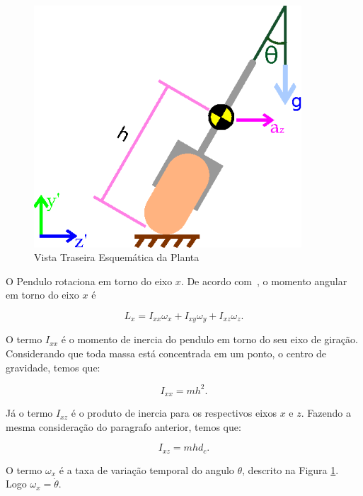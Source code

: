         \begin{figure}[h]
            \centering
            \includegraphics[width=10cm]{Imagens/theta.eps}
            \caption{Vista Traseira Esquemática da Planta}
            \label{img:VistaTraseiraEsquematica}
        \end{figure}
        
        O Pendulo rotaciona em torno do eixo $x$. De acordo com~\cite{book:goldstein}, o momento angular em torno do eixo $x$ é
        
        \begin{equation}
            L_x = I_{xx}\omega_x + I_{xy}\omega_y + I_{xz}\omega_z.
            \label{MomentoAngularOriginal}
        \end{equation}
        
        O termo $I_{xx}$ é o momento de inercia do pendulo em torno do seu eixo de giração. Considerando que toda massa está concentrada em um ponto, o centro de gravidade, temos que:
        
        \begin{equation}
            I_{xx} = mh^2.
        \end{equation}
        
        Já o termo $I_{xz}$ é o produto de inercia para os respectivos eixos $x$ e $z$. Fazendo a mesma consideração do paragrafo anterior, temos que:
        
        \begin{equation}
            I_{xz}=mhd_c.
        \end{equation}
        
        O termo $\omega_x$ é a taxa de variação temporal do angulo $\theta$, descrito na Figura \ref{img:VistaTraseiraEsquematica}. Logo $\omega_x = \dot \theta$.
        
